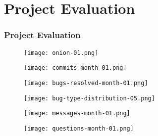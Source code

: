 \section{Project Evaluation}

\begin{frame}[allowframebreaks]
\frametitle{Project Evaluation}

\begin{center}
  \begin{figure}
    \texttt{[image: onion-01.png]}
  \end{figure}
\end{center}

\begin{center}
  \begin{figure}
    \texttt{[image: commits-month-01.png]}
  \end{figure}
\end{center}

\begin{center}
  \begin{figure}
    \texttt{[image: bugs-resolved-month-01.png]}
  \end{figure}
\end{center}

\begin{center}
  \begin{figure}
    \texttt{[image: bug-type-distribution-05.png]}
  \end{figure}
\end{center}

\begin{center}
  \begin{figure}
    \texttt{[image: messages-month-01.png]}
  \end{figure}
\end{center}

\begin{center}
  \begin{figure}
    \texttt{[image: questions-month-01.png]}
  \end{figure}
\end{center}

\end{frame}
